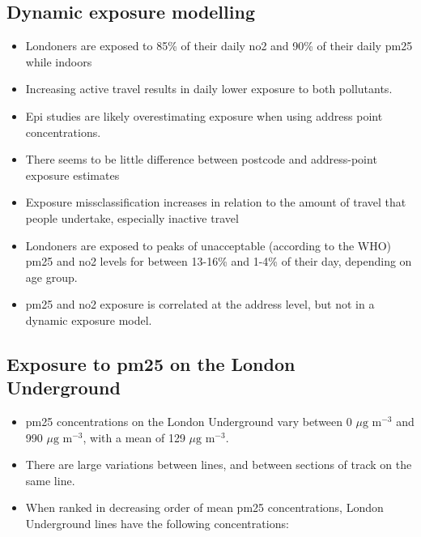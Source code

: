 \subsection{Dynamic exposure modelling}
\label{subsec:wrapup_conc_exposure}

\begin{itemize}
    \item Londoners are exposed to 85\% of their daily \gls{no2} and 90\% of their daily \gls{pm25} while indoors
    \item Increasing active travel results in daily lower exposure to both pollutants.
    \item Epi studies are likely overestimating exposure when using address point concentrations.
    \item There seems to be little difference between postcode and address-point exposure estimates
    \item Exposure missclassification increases in relation to the amount of travel that people undertake, especially inactive travel
    \item Londoners are exposed to peaks of unacceptable (according to the WHO) \gls{pm25} and \gls{no2} levels for between 13-16\% and 1-4\% of their day, depending on age group.
    \item \gls{pm25} and \gls{no2} exposure is correlated at the address level, but not in a dynamic exposure model.
\end{itemize}

\subsection{Exposure to \texorpdfstring{\gls{pm25}}{} on the London Underground}
\label{subsec:wrapup_conc_underground}

\begin{itemize}
    \item \gls{pm25} concentrations on the London Underground vary between 0 $\mu \text{g m}^{-3}$ and 990 $\mu \text{g m}^{-3}$, with a mean of 129 $\mu \text{g m}^{-3}$.
    \item There are large variations between lines, and between sections of track on the same line.
    \item When ranked in decreasing order of mean \gls{pm25} concentrations, London Underground lines have the following concentrations:
\end{itemize}


